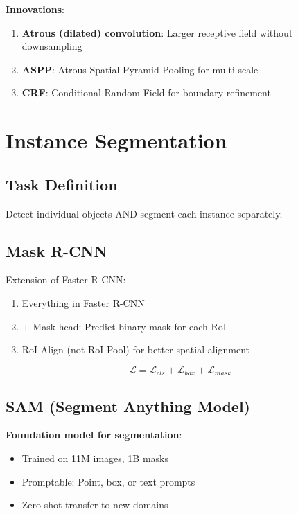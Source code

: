\textbf{Innovations}:
\begin{enumerate}
    \item \textbf{Atrous (dilated) convolution}: Larger receptive field without downsampling
    \item \textbf{ASPP}: Atrous Spatial Pyramid Pooling for multi-scale
    \item \textbf{CRF}: Conditional Random Field for boundary refinement
\end{enumerate}

\section{Instance Segmentation}
\label{sec:instance_segmentation}

\subsection{Task Definition}

Detect individual objects AND segment each instance separately.

\subsection{Mask R-CNN}

Extension of Faster R-CNN:
\begin{enumerate}
    \item Everything in Faster R-CNN
    \item + Mask head: Predict binary mask for each RoI
    \item RoI Align (not RoI Pool) for better spatial alignment
\end{enumerate}

\begin{equation}
\mathcal{L} = \mathcal{L}_{cls} + \mathcal{L}_{box} + \mathcal{L}_{mask}
\end{equation}

\subsection{SAM (Segment Anything Model)}

\textbf{Foundation model for segmentation}:
\begin{itemize}
    \item Trained on 11M images, 1B masks
    \item Promptable: Point, box, or text prompts
    \item Zero-shot transfer to new domains
\end{itemize}

